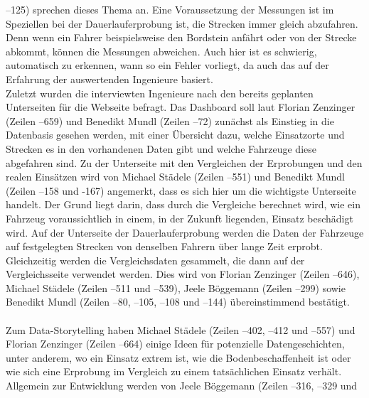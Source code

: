 --125) sprechen dieses Thema an. Eine Voraussetzung der Messungen ist im Speziellen bei der Dauerlauferprobung ist, die Strecken immer gleich abzufahren. Denn wenn ein Fahrer beispielsweise den Bordstein anfährt oder von der Strecke abkommt, können die Messungen abweichen. Auch hier ist es schwierig, automatisch zu erkennen, wann so ein Fehler vorliegt, da auch das auf der Erfahrung der auswertenden Ingenieure basiert. \\ Zuletzt wurden die interviewten Ingenieure nach den bereits geplanten Unterseiten für die Webseite befragt. Das Dashboard soll laut Florian Zenzinger (Zeilen --659) und Benedikt Mundl (Zeilen --72) zunächst als Einstieg in die Datenbasis gesehen werden, mit einer Übersicht dazu, welche Einsatzorte und Strecken es in den vorhandenen Daten gibt und welche Fahrzeuge diese abgefahren sind. Zu der Unterseite mit den Vergleichen der Erprobungen und den realen Einsätzen wird von Michael Städele (Zeilen --551) und Benedikt Mundl (Zeilen --158 und -167) angemerkt, dass es sich hier um die wichtigste Unterseite handelt. Der Grund liegt darin, dass durch die Vergleiche berechnet wird, wie ein Fahrzeug voraussichtlich in einem, in der Zukunft liegenden, Einsatz beschädigt wird. Auf der Unterseite der Dauerlauferprobung werden die Daten der Fahrzeuge auf festgelegten Strecken von denselben Fahrern über lange Zeit erprobt. Gleichzeitig werden die Vergleichsdaten gesammelt, die dann auf der Vergleichsseite verwendet werden. Dies wird von Florian Zenzinger (Zeilen --646), Michael Städele (Zeilen --511 und --539), Jeele Böggemann (Zeilen --299) sowie Benedikt Mundl (Zeilen --80, --105, --108 und --144) übereinstimmend bestätigt. \\\\ Zum Data-Storytelling haben Michael Städele (Zeilen --402, --412 und --557) und Florian Zenzinger (Zeilen --664) einige Ideen für potenzielle Datengeschichten, unter anderem, wo ein Einsatz extrem ist, wie die Bodenbeschaffenheit ist oder wie sich eine Erprobung im Vergleich zu einem tatsächlichen Einsatz verhält. Allgemein zur Entwicklung werden von Jeele Böggemann (Zeilen --316, --329 und 